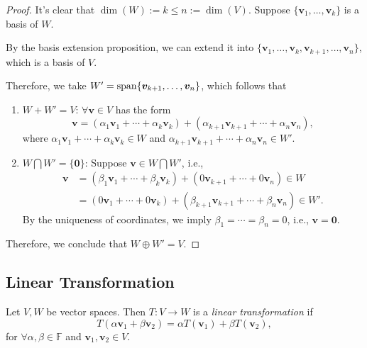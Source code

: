 \begin{proof}
It's clear that $\dim(W):=k\le n:=\dim(V)$. Suppose $\{\bm v_1,\dots,\bm v_k\}$ is a basis of $W$. 

By the basis extension proposition, we can extend it into $\{\bm v_1,\dots,\bm v_k,\bm v_{k+1},\dots,\bm v_n\}$, which is a basis of $V$.

Therefore, we take $W'=\operatorname{span}\{\bm v_{k+1},\dots,\bm v_n\}$, which follows that
\begin{enumerate}
\item
$W+W'=V$: $\forall\bm v \in V$ has the form 
\[
\bm v=
\left(
\alpha_1\bm v_1+\cdots+\alpha_k\bm v_k
\right)+\left(
\alpha_{k+1}\bm v_{k+1}+\cdots+\alpha_n\bm v_n
\right),
\]
where $\alpha_1\bm v_1+\cdots+\alpha_k\bm v_k\in W$ and $\alpha_{k+1}\bm v_{k+1}+\cdots+\alpha_n\bm v_n\in W'$.
\item
$W\bigcap W'=\{\bm0\}$: Suppose $\bm v\in W\bigcap W'$, i.e., 
\begin{align*}
\bm v&=
\left(
\beta_1\bm v_1+\cdots+\beta_k\bm v_k
\right)+
(0\bm v_{k+1}+\cdots+0\bm v_n)\in W\\
&=(0\bm v_1+\cdots+0\bm v_k)+\left(\beta_{k+1}\bm v_{k+1}+\cdots+\beta_n\bm v_n\right)\in W'.
\end{align*}
By the uniqueness of coordinates, we imply $\beta_1=\cdots=\beta_n=0$, i.e., $\bm v=\bm0$.
\end{enumerate}
Therefore, we conclude that $W\oplus W'=V$.
\end{proof}


\subsection{Linear Transformation}

\begin{definition}
Let $V,W$ be vector spaces. 
Then $T:V\to W$ is a \emph{linear transformation} if 
\[
T(\alpha\bm v_1+\beta\bm v_2)=\alpha  T(\bm v_1)+\beta T(\bm v_2),
\]
for $
\forall\alpha,\beta\in\mathbb{F}$ and $\bm v_1,\bm v_2\in V$.
\end{definition}

